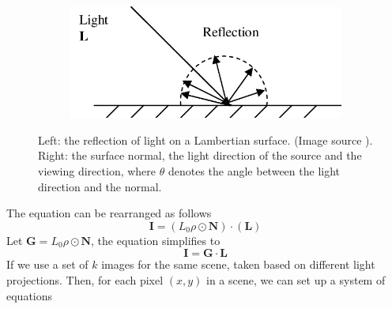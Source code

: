 \begin{figure}[th]
	\centering
	\captionsetup{width=\linewidth}
	\begin{subfigure}[b]{0.49\linewidth}
		\includegraphics[width=\textwidth]{./Figures/Lambertian-Reflection-Lambertian-Surface.png}
	\end{subfigure}
	\begin{subfigure}[b]{0.49\linewidth}
	\end{subfigure}
	\decoRule
	\caption{Left: the reflection of light on a Lambertian surface. (Image source \cite{lambertian-reflectance}). Right: the surface normal, the light direction of the source and the viewing direction, where $ \theta $ denotes the angle between the light direction and the normal.}
	\label{fig:lambertian-surface}
\end{figure}
The equation can be rearranged as follows
\[ \textbf{I} =(L_0\rho \odot \textbf{N}) \cdot ( \textbf{L}) \]
Let $ \textbf{G} =L_0\rho \odot \textbf{N} $, the equation simplifies to
\[\textbf{I} = \textbf{G} \cdot \textbf{L}\]
If we use a set of $ k $ images for the same scene, taken based on different light projections. Then, for each pixel $ (x,y) $ in a scene, we can set up a system of equations 

